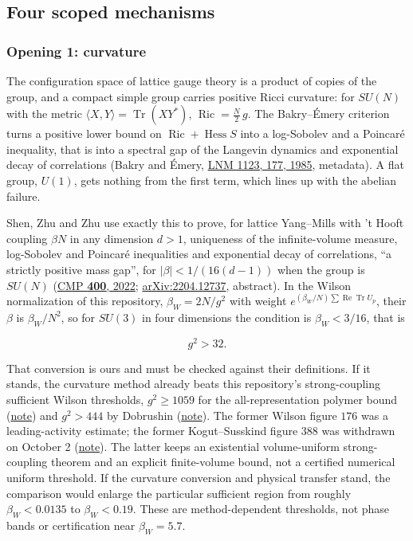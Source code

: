 \documentclass[11pt,a4paper]{article}
\begin{document}
\hypertarget{four-scoped-mechanisms}{%
\subsection{Four scoped mechanisms}\label{four-scoped-mechanisms}}

\hypertarget{opening-1-curvature}{%
\subsubsection{Opening 1: curvature}\label{opening-1-curvature}}

The configuration space of lattice gauge theory is a product of copies
of the group, and a compact simple group carries positive Ricci
curvature: for \(SU(N)\) with the metric
\(\langle X,Y\rangle=\operatorname{Tr}(XY^*)\),
\(\operatorname{Ric}=\frac N2\,g\). The Bakry--Émery criterion turns a
positive lower bound on \(\operatorname{Ric}+\operatorname{Hess}S\) into
a log-Sobolev and a Poincaré inequality, that is into a spectral gap of
the Langevin dynamics and exponential decay of correlations (Bakry and
Émery, \href{https://doi.org/10.1007/BFb0075847}{LNM 1123, 177, 1985},
metadata). A flat group, \(U(1)\), gets nothing from the first term,
which lines up with the abelian failure.

Shen, Zhu and Zhu use exactly this to prove, for lattice Yang--Mills
with 't Hooft coupling \(\beta N\) in any dimension \(d>1\), uniqueness
of the infinite-volume measure, log-Sobolev and Poincaré inequalities
and exponential decay of correlations, ``a strictly positive mass gap'',
for \(|\beta|<1/(16(d-1))\) when the group is \(SU(N)\)
(\href{https://doi.org/10.1007/s00220-022-04609-1}{CMP \textbf{400},
2022}; \href{https://arxiv.org/abs/2204.12737}{arXiv:2204.12737},
abstract). In the Wilson normalization of this repository,
\(\beta_W=2N/g^2\) with weight
\(e^{(\beta_W/N)\sum\operatorname{Re}\operatorname{Tr}U_p}\), their
\(\beta\) is \(\beta_W/N^2\), so for \(SU(3)\) in four dimensions the
condition is \(\beta_W<3/16\), that is

\[g^2>32 .\]

That conversion is ours and must be checked against their definitions.
If it stands, the curvature method already beats this repository's
strong-coupling sufficient Wilson thresholds, \(g^2\ge1059\) for the
all-representation polymer bound
(\href{wilson-strong-coupling-explicit.md}{note}) and \(g^2>444\) by
Dobrushin (\href{dobrushin-uniqueness-wilson.md}{note}). The former
Wilson figure \(176\) was a leading-activity estimate; the former
Kogut--Susskind figure \(388\) was withdrawn on October 2
(\href{strong-coupling-uniform-gap.md\#continuous-time-histories-and-the-corrected-overlap-criterion}{note}).
The latter keeps an existential volume-uniform strong-coupling theorem
and an explicit finite-volume bound, not a certified numerical uniform
threshold. If the curvature conversion and physical transfer stand, the
comparison would enlarge the particular sufficient region from roughly
\(\beta_W<0.0135\) to \(\beta_W<0.19\). These are method-dependent
thresholds, not phase bands or certification near \(\beta_W=5.7\).
\end{document}
